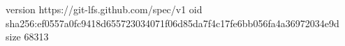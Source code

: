 version https://git-lfs.github.com/spec/v1
oid sha256:ef0557a0fc9418d655723034071f06d85da7f4c17fe6bb056fa4a36972034e9d
size 68313

